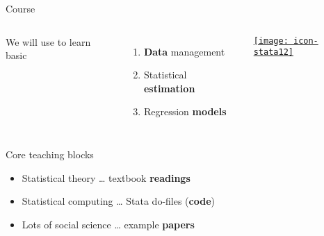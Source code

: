 \documentclass[t]{beamer}
\begin{document}
  \begin{frame}[t]{Course }

    \begin{columns}[T]


      We will use \textbf{} to learn basic\\[1em]%

      \begin{enumerate}
        \item \textbf{Data} management
        \item Statistical \textbf{estimation}
        \item Regression \textbf{models}
      \end{enumerate}


      \begin{center}
        \vspace{-2em}
        \href{http://www.stata.com/}{\texttt{[image: icon-stata12]}}
      \end{center}

    \end{columns}

      \vspace{1em}

      \begin{block}{Core teaching blocks}
        \begin{itemize}
          \item Statistical theory      \hfill … textbook \textbf{readings}
          \item Statistical computing   \hfill … Stata do-files (\textbf{code})
          \item Lots of social science  \hfill … example \textbf{papers}
        \end{itemize}
      \end{block}


  \end{frame}
\end{document}
